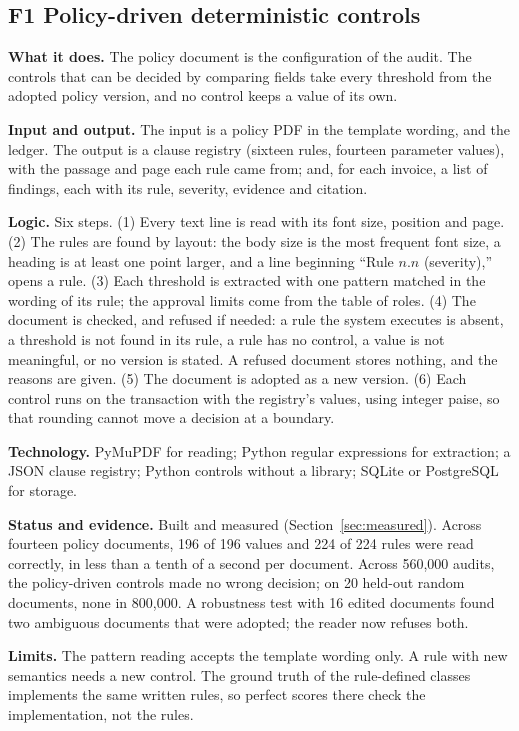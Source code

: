 \documentclass[11pt,a4paper]{article}
\begin{document}
\subsection{F1 Policy-driven deterministic controls}
\textbf{What it does.} The policy document is the configuration of the audit. The controls that can be decided by comparing fields take every threshold from the adopted policy version, and no control keeps a value of its own.

\textbf{Input and output.} The input is a policy PDF in the template wording, and the ledger. The output is a clause registry (sixteen rules, fourteen parameter values), with the passage and page each rule came from; and, for each invoice, a list of findings, each with its rule, severity, evidence and citation.

\textbf{Logic.} Six steps. (1) Every text line is read with its font size, position and page. (2) The rules are found by layout: the body size is the most frequent font size, a heading is at least one point larger, and a line beginning ``Rule $n.n$ (severity),'' opens a rule. (3) Each threshold is extracted with one pattern matched in the wording of its rule; the approval limits come from the table of roles. (4) The document is checked, and refused if needed: a rule the system executes is absent, a threshold is not found in its rule, a rule has no control, a value is not meaningful, or no version is stated. A refused document stores nothing, and the reasons are given. (5) The document is adopted as a new version. (6) Each control runs on the transaction with the registry's values, using integer paise, so that rounding cannot move a decision at a boundary.

\textbf{Technology.} PyMuPDF for reading; Python regular expressions for extraction; a JSON clause registry; Python controls without a library; SQLite or PostgreSQL for storage.

\textbf{Status and evidence.} Built and measured (Section~\ref{sec:measured}). Across fourteen policy documents, 196 of 196 values and 224 of 224 rules were read correctly, in less than a tenth of a second per document. Across 560,000 audits, the policy-driven controls made no wrong decision; on 20 held-out random documents, none in 800,000. A robustness test with 16 edited documents found two ambiguous documents that were adopted; the reader now refuses both.

\textbf{Limits.} The pattern reading accepts the template wording only. A rule with new semantics needs a new control. The ground truth of the rule-defined classes implements the same written rules, so perfect scores there check the implementation, not the rules.
\end{document}

